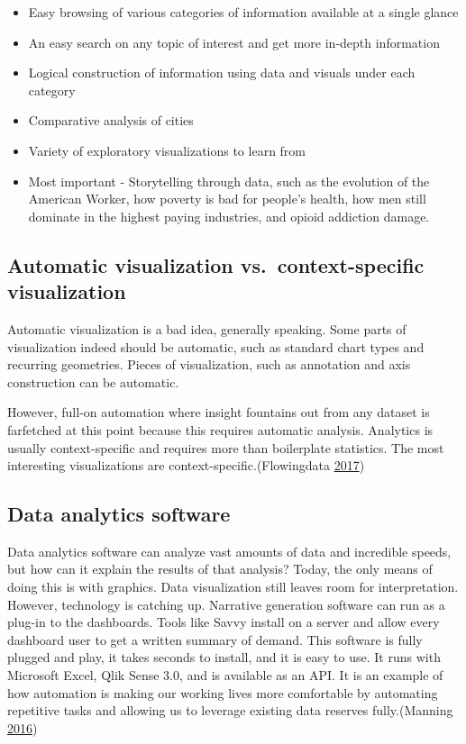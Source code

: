 \documentclass[]{book}
\providecommand{\tightlist}{%
  \setlength{\itemsep}{0pt}\setlength{\parskip}{0pt}}
\begin{document}
\begin{itemize}
\tightlist
\item
  Easy browsing of various categories of information available at a
  single glance
\item
  An easy search on any topic of interest and get more in-depth
  information
\item
  Logical construction of information using data and visuals under each
  category
\item
  Comparative analysis of cities
\item
  Variety of exploratory visualizations to learn from
\item
  Most important - Storytelling through data, such as the evolution of
  the American Worker, how poverty is bad for people's health, how men
  still dominate in the highest paying industries, and opioid addiction
  damage.
\end{itemize}

\subsection{Automatic visualization vs.~context-specific
visualization}\label{automatic-visualization-vs.context-specific-visualization}

Automatic visualization is a bad idea, generally speaking. Some parts of
visualization indeed should be automatic, such as standard chart types
and recurring geometries. Pieces of visualization, such as annotation
and axis construction can be automatic.

However, full-on automation where insight fountains out from any dataset
is farfetched at this point because this requires automatic analysis.
Analytics is usually context-specific and requires more than boilerplate
statistics. The most interesting visualizations are
context-specific.(Flowingdata \protect\hyperlink{ref-auto_viz}{2017})

\subsection{Data analytics software}\label{data-analytics-software}

Data analytics software can analyze vast amounts of data and incredible
speeds, but how can it explain the results of that analysis? Today, the
only means of doing this is with graphics. Data visualization still
leaves room for interpretation. However, technology is catching up.
Narrative generation software can run as a plug-in to the dashboards.
Tools like Savvy install on a server and allow every dashboard user to
get a written summary of demand. This software is fully plugged and
play, it takes seconds to install, and it is easy to use. It runs with
Microsoft Excel, Qlik Sense 3.0, and is available as an API. It is an
example of how automation is making our working lives more comfortable
by automating repetitive tasks and allowing us to leverage existing data
reserves fully.(Manning \protect\hyperlink{ref-work_place}{2016})
\end{document}
